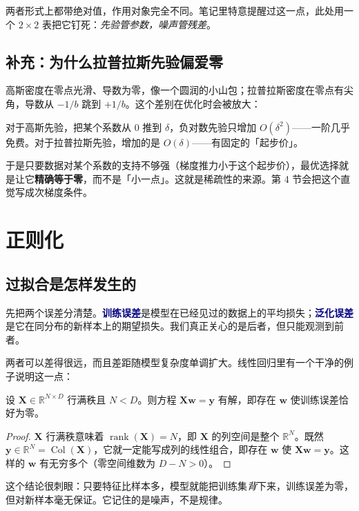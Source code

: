 \documentclass[11pt,a4paper,fontset=windows,zihao=-4]{ctexart}
\newcommand{\R}{\mathbb{R}}
\newcommand{\bX}{\mathbf{X}}
\newcommand{\by}{\mathbf{y}}
\newcommand{\bw}{\mathbf{w}}
\DeclareMathOperator{\rank}{rank}
\DeclareMathOperator{\Col}{Col}
\newcommand{\hl}[1]{\textcolor{navy}{\textbf{#1}}}
\begin{document}
两者形式上都带绝对值，作用对象完全不同。笔记里特意提醒过这一点，此处用一个 $2\times2$ 表把它钉死：\emph{先验管参数，噪声管残差}。

\subsection{补充：为什么拉普拉斯先验偏爱零}

高斯密度在零点光滑、导数为零，像一个圆润的小山包；拉普拉斯密度在零点有尖角，导数从 $-1/b$ 跳到 $+1/b$。这个差别在优化时会被放大：

对于高斯先验，把某个系数从 $0$ 推到 $\delta$，负对数先验只增加 $O(\delta^2)$——一阶几乎免费。对于拉普拉斯先验，增加的是 $O(\delta)$——有固定的「起步价」。

于是只要数据对某个系数的支持不够强（梯度推力小于这个起步价），最优选择就是让它\textbf{精确等于零}，而不是「小一点」。这就是稀疏性的来源。第 4 节会把这个直觉写成次梯度条件。


\section{正则化}

\subsection{过拟合是怎样发生的}

先把两个误差分清楚。\hl{训练误差}是模型在已经见过的数据上的平均损失；\hl{泛化误差}是它在同分布的新样本上的期望损失。我们真正关心的是后者，但只能观测到前者。

两者可以差得很远，而且差距随模型复杂度单调扩大。线性回归里有一个干净的例子说明这一点：

\begin{prop}[$N<D$ 时训练误差可以为零]
设 $\bX\in\R^{N\times D}$ 行满秩且 $N<D$。则方程 $\bX\bw=\by$ 有解，即存在 $\bw$ 使训练误差恰好为零。
\end{prop}

\begin{proof}
$\bX$ 行满秩意味着 $\rank(\bX)=N$，即 $\bX$ 的列空间是整个 $\R^N$。既然 $\by\in\R^N=\Col(\bX)$，它就一定能写成列的线性组合，即存在 $\bw$ 使 $\bX\bw=\by$。这样的 $\bw$ 有无穷多个（零空间维数为 $D-N>0$）。
\end{proof}

这个结论很刺眼：只要特征比样本多，模型就能把训练集\emph{背}下来，训练误差为零，但对新样本毫无保证。它记住的是噪声，不是规律。
\end{document}
